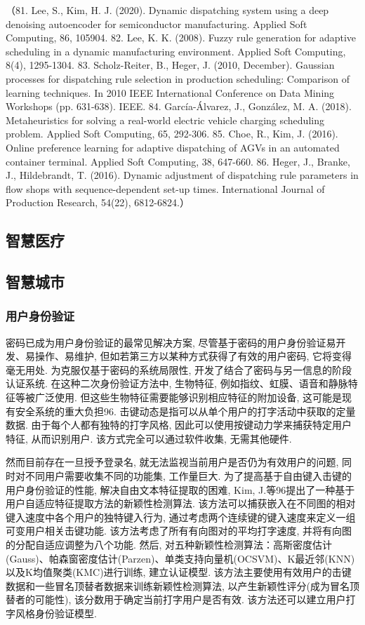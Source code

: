 \documentclass{Style/aas}
\begin{document}
\begin{multicols}{2}
  （81.	Lee, S., Kim, H. J. (2020). Dynamic dispatching system using a deep denoising autoencoder for semiconductor manufacturing. Applied Soft Computing, 86, 105904.
  82.	Lee, K. K. (2008). Fuzzy rule generation for adaptive scheduling in a dynamic manufacturing environment. Applied Soft Computing, 8(4), 1295-1304.
  83.	Scholz-Reiter, B., Heger, J. (2010, December). Gaussian processes for dispatching rule selection in production scheduling: Comparison of learning techniques. In 2010 IEEE International Conference on Data Mining Workshops (pp. 631-638). IEEE.
  84.	García-Álvarez, J., González, M. A. (2018). Metaheuristics for solving a real-world electric vehicle charging scheduling problem. Applied Soft Computing, 65, 292-306.
  85.	Choe, R., Kim, J. (2016). Online preference learning for adaptive dispatching of AGVs in an automated container terminal. Applied Soft Computing, 38, 647-660.
  86.	Heger, J., Branke, J., Hildebrandt, T. (2016). Dynamic adjustment of dispatching rule parameters in flow shops with sequence-dependent set-up times. International Journal of Production Research, 54(22), 6812-6824.）


  \subsection{智慧医疗}

  \subsection{智慧城市}
  \subsubsection{用户身份验证}
  密码已成为用户身份验证的最常见解决方案, 尽管基于密码的用户身份验证易开发、易操作、易维护, 但如若第三方以某种方式获得了有效的用户密码, 它将变得毫无用处. 为克服仅基于密码的系统局限性, 开发了结合了密码与另一信息的阶段认证系统. 在这种二次身份验证方法中, 生物特征, 例如指纹、虹膜、语音和静脉特征等被广泛使用. 但这些生物特征需要能够识别相应特征的附加设备, 这可能是现有安全系统的重大负担96. 击键动态是指可以从单个用户的打字活动中获取的定量数据. 由于每个人都有独特的打字风格, 因此可以使用按键动力学来捕获特定用户特征, 从而识别用户. 该方式完全可以通过软件收集, 无需其他硬件.

  然而目前存在一旦授予登录名, 就无法监视当前用户是否仍为有效用户的问题, 同时对不同用户需要收集不同的功能集, 工作量巨大. 为了提高基于自由键入击键的用户身份验证的性能, 解决自由文本特征提取的困难, Kim, J.等96提出了一种基于用户自适应特征提取方法的新颖性检测算法. 该方法可以捕获嵌入在不同图的相对键入速度中各个用户的独特键入行为, 通过考虑两个连续键的键入速度来定义一组可变用户相关击键功能. 该方法考虑了所有有向图对的平均打字速度, 并将有向图的分配自适应调整为八个功能. 然后, 对五种新颖性检测算法：高斯密度估计(Gauss)、帕森窗密度估计(Parzen)、单类支持向量机(OCSVM)、K最近邻(KNN)以及K均值聚类(KMC)进行训练, 建立认证模型. 该方法主要使用有效用户的击键数据和一些冒名顶替者数据来训练新颖性检测算法, 以产生新颖性评分(成为冒名顶替者的可能性), 该分数用于确定当前打字用户是否有效. 该方法还可以建立用户打字风格身份验证模型.


\end{multicols}
\end{document}
